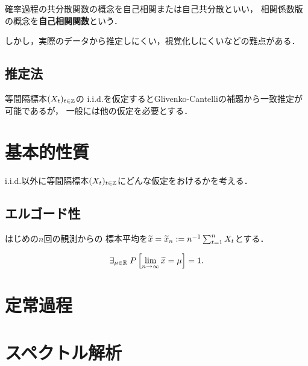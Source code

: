 \documentclass[uplatex,dvipdfmx]{jsreport}
\begin{document}
\begin{definition}
    確率過程の共分散関数の概念を自己相関または自己共分散といい，
    相関係数版の概念を\textbf{自己相関関数}という．
\end{definition}
\begin{remark}
    しかし，実際のデータから推定しにくい，視覚化しにくいなどの難点がある．
\end{remark}

\subsection{推定法}

等間隔標本$(X_t)_{t\in\mathbb{Z}}$の
i.i.d.を仮定するとGlivenko-Cantelliの補題から一致推定が可能であるが，
一般には他の仮定を必要とする．

\section{基本的性質}

\begin{tcolorbox}[colframe=ForestGreen, colback=ForestGreen!10!white,breakable,colbacktitle=ForestGreen!40!white,coltitle=black,fonttitle=\bfseries\sffamily,
title=]
    i.i.d.以外に等間隔標本$(X_t)_{t\in\mathbb{Z}}$にどんな仮定をおけるかを考える．
\end{tcolorbox}

\subsection{エルゴード性}

\begin{notation}
    はじめの$n$回の観測からの
    標本平均を$\widetilde{x}=\widetilde{x}_n:=n^{-1}\sum^n_{t=1}X_t$とする．
\end{notation}

\begin{definition}
    \[\exists_{\mu\in\mathbb{R}}\;P\left[\lim_{n\to\infty}\widetilde{x}=\mu\right]=1.\]
\end{definition}

\section{定常過程}

\section{スペクトル解析}
\end{document}
